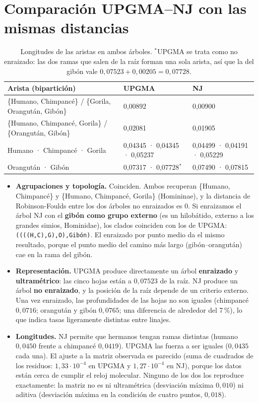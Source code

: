 \documentclass[10pt,a4paper]{article}
\begin{document}
\section{Comparación UPGMA--NJ con las mismas distancias}

\begin{table}[H]
\centering\small
\begin{tabularx}{\linewidth}{@{}L l l@{}}
\toprule
\textbf{Arista (bipartición)} & \textbf{UPGMA} & \textbf{NJ}\\
\midrule
\{Humano, Chimpancé\} / \{Gorila, Orangután, Gibón\} & 0,00892 & 0,00900\\
\{Humano, Chimpancé, Gorila\} / \{Orangután, Gibón\} & 0,02081 & 0,01905\\
Humano · Chimpancé · Gorila & 0,04345 · 0,04345 · 0,05237 & 0,04499 · 0,04191 · 0,05229\\
Orangután · Gibón & 0,07317 · 0,07728$^{*}$ & 0,07490 · 0,07815\\
\bottomrule
\end{tabularx}
\caption{Longitudes de las aristas en ambos árboles. $^{*}$UPGMA se trata como no enraizado: las dos ramas que salen de la raíz forman una sola arista, así que la del gibón vale $0{,}07523+0{,}00205=0{,}07728$.}
\end{table}

\begin{itemize}
\item \textbf{Agrupaciones y topología.} Coinciden. Ambos recuperan \{Humano, Chimpancé\} y \{Humano, Chimpancé, Gorila\} (Homininae), y la distancia de Robinson-Foulds entre los dos árboles no enraizados es 0. Si enraizamos el árbol NJ con el \textbf{gibón como grupo externo} (es un hilobátido, externo a los grandes simios, Hominidae), los clados coinciden con los de UPGMA: \texttt{((((H,C),G),O),Gibón)}. El enraizado por punto medio da el mismo resultado, porque el punto medio del camino más largo (gibón--orangután) cae en la rama del gibón.
\item \textbf{Representación.} UPGMA produce directamente un árbol \textbf{enraizado} y \textbf{ultramétrico}: las cinco hojas están a $0{,}07523$ de la raíz. NJ produce un árbol \textbf{no enraizado}, y la posición de la raíz depende de un criterio externo. Una vez enraizado, las profundidades de las hojas no son iguales (chimpancé $0{,}0716$; orangután y gibón $0{,}0765$; una diferencia de alrededor del 7\,\%), lo que indica tasas ligeramente distintas entre linajes.
\item \textbf{Longitudes.} NJ permite que hermanos tengan ramas distintas (humano $0{,}0450$ frente a chimpancé $0{,}0419$). UPGMA las fuerza a ser iguales ($0{,}0435$ cada una). El ajuste a la matriz observada es parecido (suma de cuadrados de los residuos: $1{,}33\cdot10^{-4}$ en UPGMA y $1{,}27\cdot10^{-4}$ en NJ), porque los datos están cerca de cumplir el reloj molecular. Ninguno de los dos los reproduce exactamente: la matriz no es ni ultramétrica (desviación máxima $0{,}010$) ni aditiva (desviación máxima en la condición de cuatro puntos, $0{,}018$).
\end{itemize}
\end{document}
